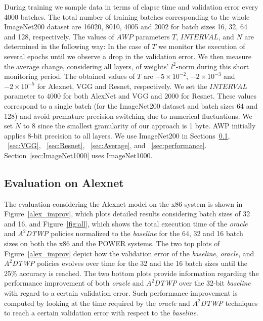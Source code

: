 During training we sample data in terms of elapse time and validation error every 4000 batches. 
The total number of training batches corresponding to the whole ImageNet200 dataset are 16020, 8010, 4005 and 2002 for batch sizes 16, 32, 64 and 128, respectively.
The values of $AWP$ parameters $T$, $INTERVAL$, and $N$ are determined in the following way:
In the case of $T$ we monitor the execution of several epochs until we observe a drop in the validation error. 
We then measure the average change, considering all layers, of weights' $l^2$-norm during this short monitoring period.
The obtained values of $T$ are $-5\times10^{-2}$, $-2\times10^{-3}$ and $-2\times10^{-5}$ for Alexnet, VGG and Resnet, respectively.
We set the $INTERVAL$ parameter to $4000$ for both AlexNet and VGG and $2000$ for Resnet. 
These values correspond to a single batch (for the ImageNet200 dataset and batch sizes 64 and 128) and avoid premature precision switching due to numerical fluctuations.  
We set $N$ to $8$ since the smallest granularity of our approach is 1 byte.
AWP initially applies 8-bit precision to all layers.
We use ImageNet200 in Sections~\ref{sec:alexnet}, ~\ref{sec:VGG}, ~\ref{sec:Resnet}, ~\ref{sec:Average}, and ~\ref{sec:performance}.
Section~\ref{sec:ImageNet1000} uses ImageNet1000.

\subsection{Evaluation on Alexnet}
\label{sec:alexnet}
The evaluation considering the Alexnet model on the x86 system is shown in  
Figure~\ref{alex_improv}, which plots detailed results considering batch sizes of 
32 and 16, and Figure~\ref{fig:all}, which shows the total execution time of the 
\textit{oracle} and \textit{$A^2$DTWP} policies normalized to the \textit{baseline} 
for the 64, 32 and 16 batch sizes on both the x86 and the POWER systems.
The two top plots of Figure~\ref{alex_improv} depict how the validation error of the 
\textit{baseline}, \textit{oracle}, and \textit{$A^2$DTWP} policies evolves 
over time for the 32 and the 16 batch sizes until the 25\% accuracy is reached.
The two bottom plots provide information regarding the performance 
improvement of both \textit{oracle} and \textit{$A^2$DTWP} over the 
32-bit \textit{baseline} with regard to a certain validation error. 
Such performance improvement is computed by looking at the time required by the 
\textit{oracle} and \textit{$A^2$DTWP} techniques to reach a certain validation error with respect to the \textit{baseline}.

